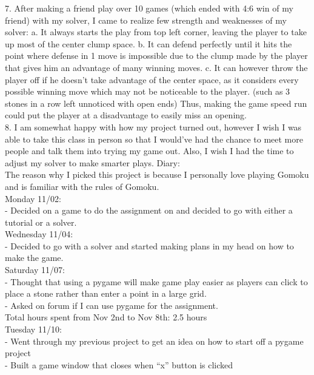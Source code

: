 \documentclass[a4paper]{article}
\begin{document}
7.	After making a friend play over 10 games (which ended with 4:6 win of my friend) with my solver, I came to realize few strength and weaknesses of my solver:
	a.	It always starts the play from top left corner, leaving the player to take up most of the center clump space.
	b.	It can defend perfectly until it hits the point where defense in 1 move is impossible due to the clump made by the player that gives him an advantage of many winning moves.
	c.	It can however throw the player off if he doesn’t take advantage of the center space, as it considers every possible winning move which may not be noticeable to the player. (such as 3 stones in a row left unnoticed with open ends) Thus, making the game speed run could put the player at a disadvantage to easily miss an opening.
\\
8. I am somewhat happy with how my project turned out, however I wish I was able to take this class in person so that I would've had the chance to meet more people and talk them into trying my game out. Also, I wish I had the time to adjust my solver to make smarter plays.
\newpage
\noindent Diary:\\
The reason why I picked this project is because I personally love playing Gomoku and is familiar with the rules of Gomoku.\\
\newline
Monday 11/02:\\
\indent -	Decided on a game to do the assignment on and decided to go with either a tutorial or a solver.\\
Wednesday 11/04:\\
\indent -	Decided to go with a solver and started making plans in my head on how to make the game.\\
Saturday 11/07:\\
\indent -	Thought that using a pygame will make game play easier as players can click to place a stone rather than enter a point in a large grid.\\
\indent -	Asked on forum if I can use pygame for the assignment.
\newline\\
Total hours spent from Nov 2nd to Nov 8th: 2.5 hours
\newline\\
Tuesday 11/10:\\
\indent -	Went through my previous project to get an idea on how to start off a pygame project\\
\indent -	Built a game window that closes when “x” button is clicked\\
\end{document}
